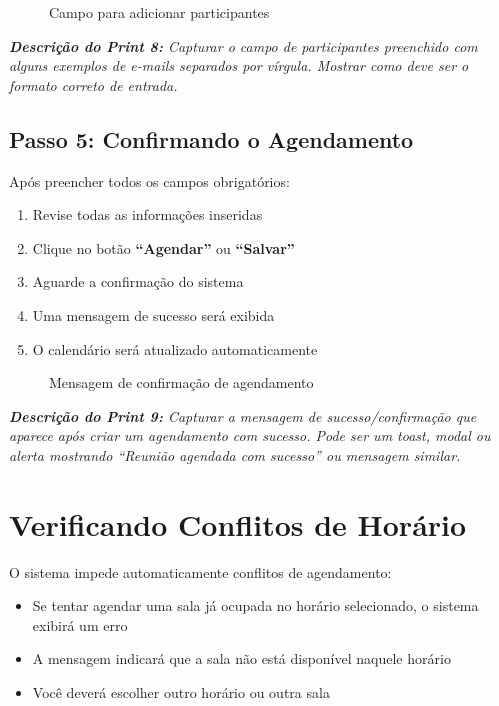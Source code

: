 \documentclass[12pt,a4paper]{article}
\begin{document}
\begin{figure}[H]
    \centering
    \caption{Campo para adicionar participantes}
    \label{fig:participantes}
\end{figure}

\textit{\textbf{Descrição do Print 8:} Capturar o campo de participantes preenchido com alguns exemplos de e-mails separados por vírgula. Mostrar como deve ser o formato correto de entrada.}

\newpage

\subsection{Passo 5: Confirmando o Agendamento}

Após preencher todos os campos obrigatórios:

\begin{enumerate}[leftmargin=*]
    \item Revise todas as informações inseridas
    \item Clique no botão \textbf{``Agendar''} ou \textbf{``Salvar''}
    \item Aguarde a confirmação do sistema
    \item Uma mensagem de sucesso será exibida
    \item O calendário será atualizado automaticamente
\end{enumerate}

\begin{figure}[H]
    \centering
    \caption{Mensagem de confirmação de agendamento}
    \label{fig:confirmacao}
\end{figure}

\textit{\textbf{Descrição do Print 9:} Capturar a mensagem de sucesso/confirmação que aparece após criar um agendamento com sucesso. Pode ser um toast, modal ou alerta mostrando ``Reunião agendada com sucesso'' ou mensagem similar.}

\section{Verificando Conflitos de Horário}

O sistema impede automaticamente conflitos de agendamento:

\begin{itemize}[leftmargin=*]
    \item Se tentar agendar uma sala já ocupada no horário selecionado, o sistema exibirá um erro
    \item A mensagem indicará que a sala não está disponível naquele horário
    \item Você deverá escolher outro horário ou outra sala
\end{itemize}
\end{document}
